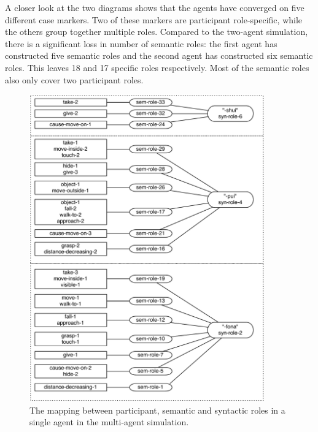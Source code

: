 A closer look at the two diagrams shows that the agents have converged on five different case markers. Two of these markers are participant role-specific, while the others group together multiple roles. Compared to the two-agent simulation, there is a significant loss in number of semantic roles: the first agent has constructed five semantic roles and the second agent has constructed six semantic roles. This leaves 18 and 17 specific roles respectively. Most of the semantic roles also only cover two participant roles.
\begin{figure}[p]
\centerline{\includegraphics[width=0.9\textwidth]{Chapter4/figs/multi-agent}}
  \caption[Syntactic roles: the mapping for a single agent (1)]{The mapping between participant, semantic and syntactic roles in a single agent in the multi-agent simulation.}
   \label{f:multi-agent}
\end{figure}
